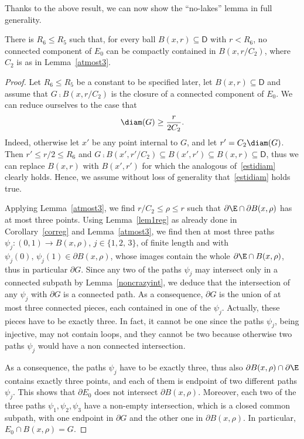 Thanks to the above result, we can now show the ``no-lakes'' lemma in full generality.
\begin{lem}\label{nolakesgen}
There is $R_6\leq R_5$ such that, for every ball $B(x,r)\subseteq \mathsf{D}$ with $r<R_6$, no connected component of $E_0$ can be compactly contained in $B(x,r/C_2)$, where $C_2$ is as in Lemma~\ref{atmost3}.
\end{lem}
\begin{proof}
Let $R_6\leq R_5$ be a constant to be specified later, let $B(x,r)\subseteq \mathsf{D}$ and assume that $G\comp B(x,r/C_2)$ is the closure of a connected component of $E_0$. We can reduce ourselves to the case that
\begin{equation}\label{estidiam}
\diam(G) \geq \frac r{2C_2}.
\end{equation}
Indeed, otherwise let $x'$ be any point internal to $G$, and let $r'=C_2\diam(G)$. Then $r'\leq r/2\leq R_6$ and $G\comp B(x',r'/C_2)\subseteq B(x',r')\subseteq B(x,r)\subseteq \mathsf{D}$, thus we can replace $B(x,r)$ with $B(x',r')$ for which the analogous of~\eqref{estidiam} clearly holds. Hence, we assume without loss of generality that~\eqref{estidiam} holds true.

Applying Lemma~\ref{atmost3}, we find $r/C_2\leq \rho\leq r$ such that $\partial\E\cap \partial B(x,\rho)$ has at most three points. Using Lemma~\ref{lem1reg} as already done in Corollary~\ref{correg} and Lemma~\ref{atmost3}, we find then at most three paths $\psi_j:(0,1)\to B(x,\rho)$, $j\in \{1,2,\,3\}$, of finite length and with $\psi_j(0),\, \psi_j(1)\in \partial B(x,\rho)$, whose images contain the whole $\partial\E\cap B(x,\rho)$, thus in particular $\partial G$. Since any two of the paths $\psi_j$ may intersect only in a connected subpath by Lemma~\ref{noncrazyint}, we deduce that the intersection of any $\psi_j$ with $\partial G$ is a connected path. As a consequence, $\partial G$ is the union of at most three connected pieces, each contained in one of the $\psi_j$. Actually, these pieces have to be exactly three. In fact, it cannot be one since the paths $\psi_j$, being injective, may not contain loops, and they cannot be two because otherwise two paths $\psi_j$ would have a non connected intersection.

As a consequence, the paths $\psi_j$ have to be exactly three, thus also $\partial B(x,\rho)\cap \partial\E$ contains exactly three points, and each of them is endpoint of two different paths $\psi_j$. This shows that $\partial E_0$ does not intersect $\partial B(x,\rho)$. Moreover, each two of the three paths $\psi_1,\psi_2,\psi_3$ have a non-empty intersection, which is a closed common subpath, with one endpoint in $\partial G$ and the other one in $\partial B(x,\rho)$. In particular, $E_0\cap B(x,\rho)=G$.


\end{proof}
